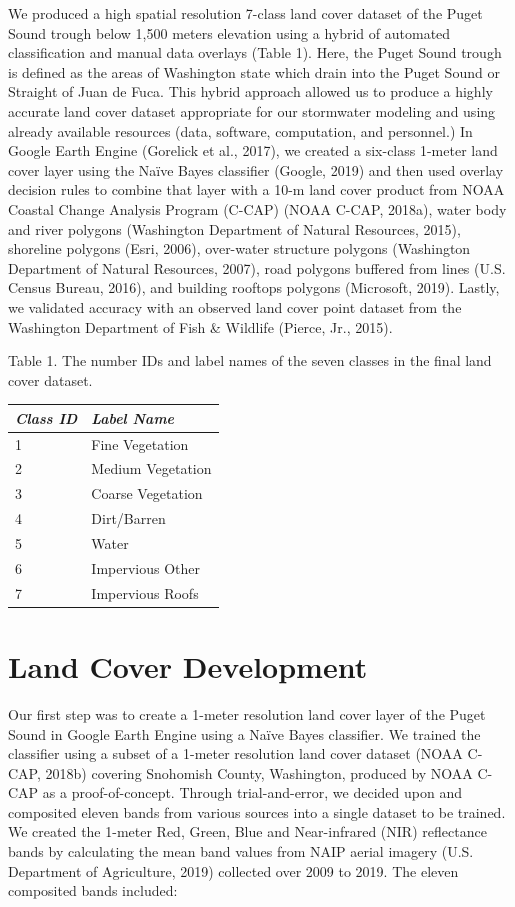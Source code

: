 \documentclass[
]{report}
\begin{document}
We produced a high spatial resolution 7-class land cover dataset of the Puget Sound trough below 1,500 meters elevation using a hybrid of automated classification and manual data overlays (Table 1). Here, the Puget Sound trough is defined as the areas of Washington state which drain into the Puget Sound or Straight of Juan de Fuca. This hybrid approach allowed us to produce a highly accurate land cover dataset appropriate for our stormwater modeling and using already available resources (data, software, computation, and personnel.) In Google Earth Engine (Gorelick et al., 2017), we created a six-class 1-meter land cover layer using the Naïve Bayes classifier (Google, 2019) and then used overlay decision rules to combine that layer with a 10-m land cover product from NOAA Coastal Change Analysis Program (C-CAP) (NOAA C-CAP, 2018a), water body and river polygons (Washington Department of Natural Resources, 2015), shoreline polygons (Esri, 2006), over-water structure polygons (Washington Department of Natural Resources, 2007), road polygons buffered from lines (U.S. Census Bureau, 2016), and building rooftops polygons (Microsoft, 2019). Lastly, we validated accuracy with an observed land cover point dataset from the Washington Department of Fish \& Wildlife (Pierce, Jr., 2015).

Table 1. The number IDs and label names of the seven classes in the final land cover dataset.

\begin{longtable}[]{@{}ll@{}}
\toprule
\emph{Class ID} & \emph{Label Name}\tabularnewline
\midrule
\endhead
1 & Fine Vegetation\tabularnewline
2 & Medium Vegetation\tabularnewline
3 & Coarse Vegetation\tabularnewline
4 & Dirt/Barren\tabularnewline
5 & Water\tabularnewline
6 & Impervious Other\tabularnewline
7 & Impervious Roofs\tabularnewline
\bottomrule
\end{longtable}

\hypertarget{land-cover-development}{%
\section{Land Cover Development}\label{land-cover-development}}

Our first step was to create a 1-meter resolution land cover layer of the Puget Sound in Google Earth Engine using a Naïve Bayes classifier. We trained the classifier using a subset of a 1-meter resolution land cover dataset (NOAA C-CAP, 2018b) covering Snohomish County, Washington, produced by NOAA C-CAP as a proof-of-concept. Through trial-and-error, we decided upon and composited eleven bands from various sources into a single dataset to be trained. We created the 1-meter Red, Green, Blue and Near-infrared (NIR) reflectance bands by calculating the mean band values from NAIP aerial imagery (U.S. Department of Agriculture, 2019) collected over 2009 to 2019. The eleven composited bands included:
\end{document}
